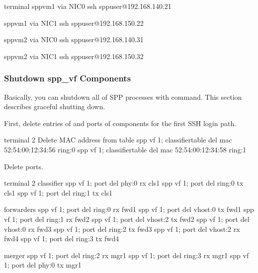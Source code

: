 \documentclass[a4paper,11pt,openany,oneside,english]{sphinxmanual}
\begin{document}
\begin{sphinxVerbatim}[commandchars=\\\{\},formatcom=\footnotesize]
 terminal 
 spp\PYGZhy{}vm1 via NIC0
 ssh sppuser@192.168.140.21

 spp\PYGZhy{}vm1 via NIC1
 ssh sppuser@192.168.150.22

 spp\PYGZhy{}vm2 via NIC0
 ssh sppuser@192.168.140.31

 spp\PYGZhy{}vm2 via NIC1
 ssh sppuser@192.168.150.32
\end{sphinxVerbatim}


\subsubsection{Shutdown spp\_vf Components}
\label{\detokenize{usecases/spp_vf:spp-usecases-vf-ssh-shutdown}}\label{\detokenize{usecases/spp_vf:id3}}
Basically, you can shutdown all of SPP processes with 
command.
This section describes graceful shutting down.

First, delete entries of  and ports of components
for the first SSH login path.

\begin{sphinxVerbatim}[commandchars=\\\{\},formatcom=\footnotesize]
\PYGZsh{} terminal 2
\PYGZsh{} Delete MAC address from table
spp \PYGZgt{} vf 1; classifier\PYGZus{}table del mac 52:54:00:12:34:56 ring:0
spp \PYGZgt{} vf 1; classifier\PYGZus{}table del mac 52:54:00:12:34:58 ring:1
\end{sphinxVerbatim}

Delete ports.

\begin{sphinxVerbatim}[commandchars=\\\{\},formatcom=\footnotesize]
\PYGZsh{} terminal 2
\PYGZsh{} classifier
spp \PYGZgt{} vf 1; port del phy:0 rx cls1
spp \PYGZgt{} vf 1; port del ring:0 tx cls1
spp \PYGZgt{} vf 1; port del ring:1 tx cls1

\PYGZsh{} forwarders
spp \PYGZgt{} vf 1; port del ring:0 rx fwd1
spp \PYGZgt{} vf 1; port del vhost:0 tx fwd1
spp \PYGZgt{} vf 1; port del ring:1 rx fwd2
spp \PYGZgt{} vf 1; port del vhost:2 tx fwd2
spp \PYGZgt{} vf 1; port del vhost:0 rx fwd3
spp \PYGZgt{} vf 1; port del ring:2 tx fwd3
spp \PYGZgt{} vf 1; port del vhost:2 rx fwd4
spp \PYGZgt{} vf 1; port del ring:3 tx fwd4

\PYGZsh{} merger
spp \PYGZgt{} vf 1; port del ring:2 rx mgr1
spp \PYGZgt{} vf 1; port del ring:3 rx mgr1
spp \PYGZgt{} vf 1; port del phy:0 tx mgr1
\end{sphinxVerbatim}
\end{document}
